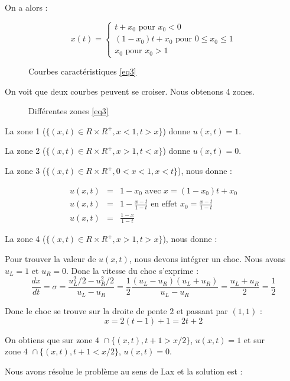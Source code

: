 \documentclass{article}
\begin{document}
On a alors :

\[
x(t) = \left\{ \begin{matrix}
	t + x_0 \text{ pour } x_0 < 0 \\
	(1-x_0) t + x_0 \text{ pour } 0 \leq x_0 \leq 1 \\
	x_0 \text{ pour } x_0 > 1
\end{matrix} \right. \]

\begin{figure}[h]
  
  \caption{Courbes caractéristiques \ref{eq3}}
\end{figure}

On voit que deux courbes peuvent se croiser. Nous obtenons 4 zones.

\begin{figure}[h]
  
  \caption{Différentes zones \ref{eq3}}
\end{figure}

La zone 1 ($\{(x,t) \in R \times R^{+}, x < 1, t > x\}$) donne $u(x,t) = 1$.

La zone 2 ($\{(x,t) \in R \times R^{+}, x > 1, t < x\}$) donne $u(x,t) = 0$.

La zone 3 ($\{(x,t) \in R \times R^{+}, 0 < x < 1, x < t \}$), nous donne :

\begin{eqnarray*}
	u(x,t) &=& 1 - x_0 \text{ avec } x = (1-x_0) t + x_0 \\
	u(x,t) &=& 1 - \frac{x-t}{1-t} \text{ en effet } x_0 = \frac{x-t}{1-t} \\
	u(x,t) &=& \frac{1-x}{1-t}  
\end{eqnarray*}

La zone 4 ($\{(x,t) \in R \times R^+, x > 1, t > x\}$), nous donne :

Pour trouver la valeur de $u(x,t)$, nous devons intégrer un choc. Nous avons $u_L=1$ et $u_R=0$. Donc la vitesse du choc s'exprime :
\[ \frac{dx}{dt} = \sigma = \frac{u_L^2/2 - u_R^2/2}{u_L - u_R} = \frac{1}{2} \frac{(u_L-u_R)(u_L+u_R)}{u_L-u_R} = \frac{u_L+u_R}{2} = \frac{1}{2} \]

Donc le choc se trouve sur la droite de pente $2$ et passant par $(1,1)$ :
\[ x = 2 (t - 1) + 1 = 2t + 2 \]

On obtiens que sur $\text{zone 4 } \cap \{(x,t), t+1 > x/2\}$, $u(x,t) = 1$ et sur $\text{zone 4 } \cap \{(x,t), t+1 < x/2\}$, $u(x,t) = 0$.
\newline

Nous avons résolue le problème au sens de Lax et la solution est : 
\end{document}
